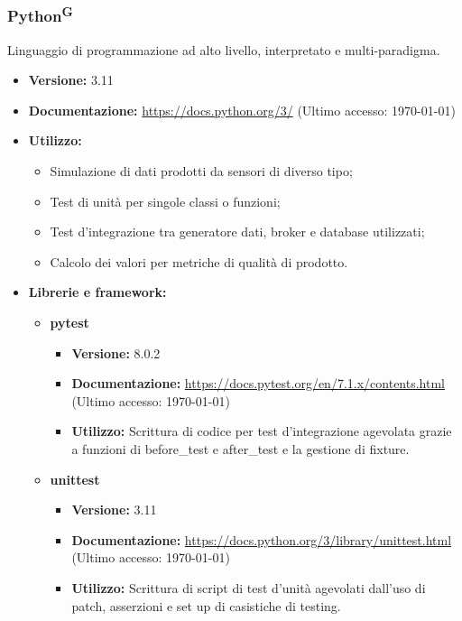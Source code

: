 \documentclass[8pt]{article}
\newcommand{\glossterm}[1]{#1\textsuperscript{G}} %
\begin{document}
\subsubsection{\glossterm{Python}}
Linguaggio di programmazione ad alto livello, interpretato e multi-paradigma.
\begin{itemize}
    \item \textbf{Versione:} 3.11
    \item \textbf{Documentazione:} \href{https://docs.python.org/3/}{\color{myblue}https://docs.python.org/3/} (Ultimo accesso: \today)
    \item \textbf{Utilizzo:} 
    \begin{itemize}
        \item Simulazione di dati prodotti da sensori di diverso tipo;
        \item Test di unità per singole classi o funzioni;
        \item Test d'integrazione tra generatore dati, broker e database utilizzati;
        \item Calcolo dei valori per metriche di qualità di prodotto.
    \end{itemize}
    \clearpage
    \item \textbf{Librerie e framework:}   
    \begin{itemize}
        \item \textbf{pytest}
        \begin{itemize}
            \item \textbf{Versione:} 8.0.2
            \item \textbf{Documentazione:} \href{https://docs.pytest.org/en/7.1.x/contents.html}{\color{myblue}https://docs.pytest.org/en/7.1.x/contents.html} (Ultimo accesso: \today)
            \item \textbf{Utilizzo:} Scrittura di codice per test d'integrazione agevolata grazie a funzioni di before\_test e after\_test e la gestione di fixture.
        \end{itemize}
        \item \textbf{unittest}
        \begin{itemize}
            \item \textbf{Versione:} 3.11
            \item \textbf{Documentazione:} \href{https://docs.python.org/3/library/unittest.html}{\color{myblue}https://docs.python.org/3/library/unittest.html} (Ultimo accesso: \today)
            \item \textbf{Utilizzo:} Scrittura di script di test d'unità agevolati dall'uso di patch, asserzioni e set up di casistiche di testing.

\end{itemize}
\end{itemize}
\end{itemize}
\end{document}
